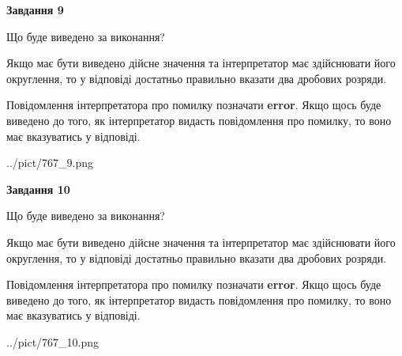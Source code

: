 \documentclass[12pt, ukrainian]{article}
\begin{document}
{\begin {Large}
{\begin {center}\textbf{Завдання 9}\end {center}}\par
Що буде виведено за виконання? \par

Якщо має бути виведено дійсне значення та інтерпретатор має здійснювати його округлення, 
то у відповіді достатньо правильно вказати два дробових розряди.

Повідомлення інтерпретатора про помилку позначати \textbf{error}.
Якщо щось буде виведено до того, як інтерпретатор видасть повідомлення про помилку, 
то воно має вказуватись у відповіді. \par

\begin{center}
	{../pict/767_9.png}
\end{center}
\newpage

{\begin {center}\textbf{Завдання 10}\end {center}}\par
Що буде виведено за виконання? \par

Якщо має бути виведено дійсне значення та інтерпретатор має здійснювати його округлення, 
то у відповіді достатньо правильно вказати два дробових розряди.

Повідомлення інтерпретатора про помилку позначати \textbf{error}.
Якщо щось буде виведено до того, як інтерпретатор видасть повідомлення про помилку, 
то воно має вказуватись у відповіді. \par

\begin{center}
	{../pict/767_10.png}
\end{center}
\newpage

\end {Large}}
\end{document}
